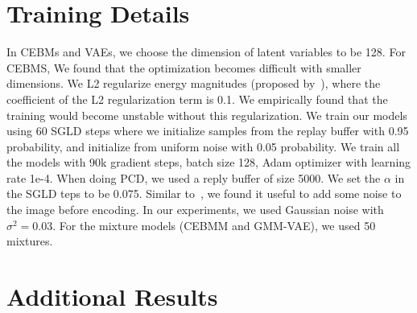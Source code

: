 \section{Training Details}
\label{app:sec:training-details}
In CEBMs and VAEs, we choose the dimension of latent variables to be 128. For CEBMS, We found that the optimization becomes difficult with smaller dimensions. We L2 regularize energy magnitudes (proposed by~\citet{du2019implicit}), where the coefficient of the L2 regularization term is 0.1. We empirically found that the training would become unstable without this regularization. We train our models using 60 SGLD steps where we initialize samples from the replay buffer with 0.95 probability, and initialize from uniform noise with 0.05 probability. We train all the models with 90k gradient steps, batch size 128, Adam optimizer with learning rate 1e-4. When doing PCD, we used a reply buffer of size 5000. We set the $\alpha$ in the SGLD teps to be 0.075. Similar to~\citet{du2019implicit}, we found it useful to add some noise to the image before encoding. In our experiments, we used Gaussian noise with $\sigma^{2} = 0.03$. For the mixture models (CEBMM and GMM-VAE), we used 50 mixtures.  

\newpage
\section{Additional Results}
\label{app:sec:additional-results}

